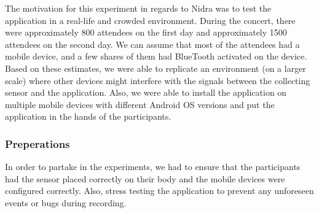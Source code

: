 The motivation for this experiment in regards to Nidra was to test the application in a real-life and crowded environment. During the concert, there were approximately 800 attendees on the first day and approximately 1500 attendees on the second day. We can assume that most of the attendees had a mobile device, and a few shares of them had BlueTooth activated on the device. Based on these estimates, we were able to replicate an environment (on a larger scale) where other devices might interfere with the signals between the collecting sensor and the application. Also, we were able to install the application on multiple mobile devices with different Android OS versions and put the application in the hands of the participants. 

\subsubsection{Preperations}

\begin{table}
\begin{center}
\caption{Device models used during the concert}
\end{center}
\end{table}

In order to partake in the experiments, we had to ensure that the participants had the sensor placed correctly on their body and the mobile devices were configured correctly. Also, stress testing the application to prevent any unforeseen events or bugs during recording. 

